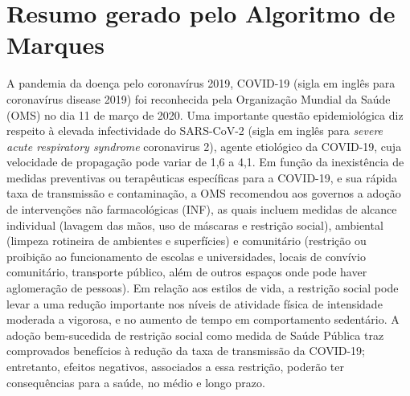 \section{Resumo gerado pelo Algoritmo de Marques}
\label{chap:marques_resumo}
A pandemia da doença pelo coronavírus 2019, COVID-19 (sigla em inglês para coronavírus disease 2019) foi reconhecida pela Organização Mundial da Saúde (OMS) no dia 11 de março de 2020.
Uma importante questão epidemiológica diz respeito à elevada infectividade do SARS-CoV-2 (sigla em inglês para \textit{severe acute respiratory syndrome} coronavirus 2), agente etiológico da COVID-19, cuja velocidade de propagação pode variar de 1,6 a 4,1.
Em função da inexistência de medidas preventivas ou terapêuticas específicas para a COVID-19, e sua rápida taxa de transmissão e contaminação, a OMS recomendou aos governos a adoção de intervenções não farmacológicas (INF), as quais incluem medidas de alcance individual (lavagem das mãos, uso de máscaras e restrição social), ambiental (limpeza rotineira de ambientes e superfícies) e comunitário (restrição ou proibição ao funcionamento de escolas e universidades, locais de convívio comunitário, transporte público,
além de outros espaços onde pode haver aglomeração de pessoas).
Em relação aos estilos de vida, a restrição social pode levar a uma redução importante nos níveis de atividade física de intensidade moderada a vigorosa, e no aumento de tempo em comportamento sedentário.
A adoção bem-sucedida de restrição social como medida de Saúde Pública traz comprovados benefícios à redução da taxa de transmissão da COVID-19; entretanto, efeitos negativos, associados a essa restrição, poderão ter consequências para a saúde, no médio e longo prazo.
